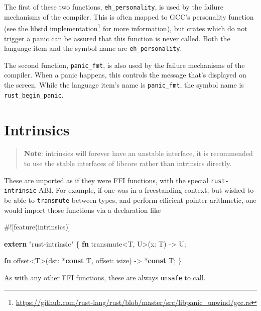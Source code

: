 \documentclass[a4paper,]{book}
\renewcommand*{\hypertarget}[3][\ar]{%
  \def\ar{#2}%
  \label{#1}%
  #3}
\newenvironment{Shaded}{\begin{snugshade}}{\end{snugshade}}
\newcommand{\KeywordTok}[1]{\textcolor[rgb]{0.13,0.29,0.53}{\textbf{{#1}}}}
\newcommand{\DataTypeTok}[1]{\textcolor[rgb]{0.13,0.29,0.53}{{#1}}}
\newcommand{\StringTok}[1]{\textcolor[rgb]{0.31,0.60,0.02}{{#1}}}
\newcommand{\AttributeTok}[1]{\textcolor[rgb]{0.77,0.63,0.00}{{#1}}}
\newcommand{\NormalTok}[1]{{#1}}
\renewcommand{\href}[2]{#2\footnote{\url{#1}}}
\begin{document}
The first of these two functions, \texttt{eh\_personality}, is used by
the failure mechanisms of the compiler. This is often mapped to GCC's
personality function (see the
\href{https://github.com/rust-lang/rust/blob/master/src/libpanic_unwind/gcc.rs}{libstd
implementation} for more information), but crates which do not trigger a
panic can be assured that this function is never called. Both the
language item and the symbol name are \texttt{eh\_personality}.

The second function, \texttt{panic\_fmt}, is also used by the failure
mechanisms of the compiler. When a panic happens, this controls the
message that's displayed on the screen. While the language item's name
is \texttt{panic\_fmt}, the symbol name is \texttt{rust\_begin\_panic}.

\hypertarget{sec--intrinsics}{\section{Intrinsics}\label{sec--intrinsics}}

\begin{quote}
\textbf{Note}: intrinsics will forever have an unstable interface, it is
recommended to use the stable interfaces of libcore rather than
intrinsics directly.
\end{quote}

These are imported as if they were FFI functions, with the special
\texttt{rust-intrinsic} ABI. For example, if one was in a freestanding
context, but wished to be able to \texttt{transmute} between types, and
perform efficient pointer arithmetic, one would import those functions
via a declaration like

\begin{Shaded}
\begin{Highlighting}[]
\AttributeTok{#![}\NormalTok{feature}\AttributeTok{(}\NormalTok{intrinsics}\AttributeTok{)]}

\KeywordTok{extern} \StringTok{"rust-intrinsic"} \NormalTok{\{}
    \KeywordTok{fn} \NormalTok{transmute<T, U>(x: T) -> U;}

    \KeywordTok{fn} \NormalTok{offset<T>(dst: *}\KeywordTok{const} \NormalTok{T, offset: }\DataTypeTok{isize}\NormalTok{) -> *}\KeywordTok{const} \NormalTok{T;}
\NormalTok{\}}
\end{Highlighting}
\end{Shaded}

As with any other FFI functions, these are always \texttt{unsafe} to
call.
\end{document}
